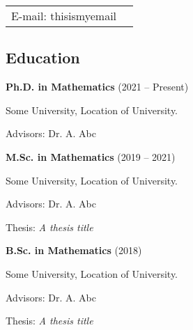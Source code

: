 \documentclass[margin,line]{res}
\newenvironment{basiclist}{
  \begin{list}{}{
      \setlength{\itemsep}{0.06in}
      \setlength{\parsep}{0in} 
      \setlength{\parskip}{0in}
      \setlength{\topsep}{0in} 
      \setlength{\partopsep}{0in} 
      \setlength{\rightmargin}{0in}
      \setlength{\leftmargin}{0in}
      }}{\end{list}
  }
\newenvironment{indent-no-right-stop}{
  \begin{list}{}{
      \setlength{\itemsep}{0.02in}
      \setlength{\parsep}{0in} 
      \setlength{\parskip}{0in}
      \setlength{\topsep}{0in} 
      \setlength{\partopsep}{0.025in} 
      \setlength{\rightmargin}{0in}
      \setlength{\leftmargin}{0.3in}
      }}{\end{list}
  }
\begin{document}

\begin{minipage}{0.7\paperwidth}
\begin{flushright}
\begin{tabular}{ll}
E-mail:  thisismyemail%
\end{tabular}
\end{flushright}
\vspace*{-0.5in}
\end{minipage}


\begin{resume}


\section{\sc Education}

\begin{basiclist}

\item {\bf  Ph.D. in Mathematics} (2021 -- Present) 

\begin{indent-no-right-stop}
\item Some University, Location of University. 
\item Advisors: Dr. A. Abc
\end{indent-no-right-stop}

\item {\bf  M.Sc. in Mathematics} (2019 -- 2021)

\begin{indent-no-right-stop}
\item Some University, Location of University. 
\item Advisors: Dr. A. Abc 
\item Thesis: \textit{A thesis title} 
\end{indent-no-right-stop}

\item {\bf  B.Sc. in Mathematics} (2018)

\begin{indent-no-right-stop}
\item Some University, Location of University. 
\item Advisors: Dr. A. Abc 
\item Thesis: \textit{A thesis title} 
\end{indent-no-right-stop}


\end{basiclist}
\end{resume}
\end{document}
